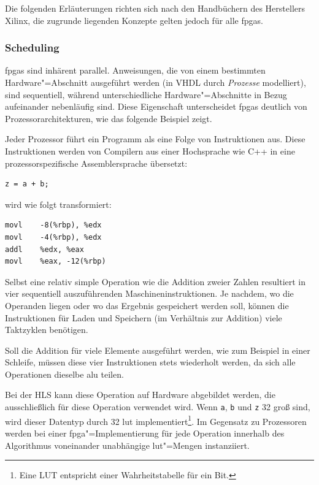 Die folgenden Erläuterungen richten sich nach den Handbüchern des Herstellers
Xilinx, die zugrunde liegenden Konzepte gelten jedoch für alle \gls{fpga}s.

\subsubsection{Scheduling}

\gls{fpga}s sind inhärent parallel. Anweisungen, die von einem bestimmten
Hardware"=Abschnitt ausgeführt werden (in VHDL durch \textit{Prozesse}
modelliert), sind sequentiell, während unterschiedliche Hardware"=Abschnitte in
Bezug aufeinander nebenläufig sind. Diese Eigenschaft unterscheidet \gls{fpga}s
deutlich von Prozessorarchitekturen, wie das folgende Beispiel zeigt.

Jeder Prozessor führt ein Programm als eine Folge von Instruktionen aus. Diese
Instruktionen werden von Compilern aus einer Hochsprache wie C++ in eine
prozessorspezifische Assemblersprache übersetzt:
\begin{code}
    \begin{verbatim}
z = a + b;
    \end{verbatim}
\end{code}
wird wie folgt transformiert:
\begin{code}
    \begin{verbatim}
movl    -8(%rbp), %edx
movl    -4(%rbp), %edx
addl    %edx, %eax
movl    %eax, -12(%rbp)
    \end{verbatim}
\end{code}
Selbst eine relativ simple Operation wie die Addition zweier Zahlen resultiert
in vier sequentiell auszuführenden Maschineninstruktionen. Je nachdem, wo die
Operanden liegen oder wo das Ergebnis gespeichert werden soll, können die
Instruktionen für Laden und Speichern (im Verhältnis zur Addition) viele
Taktzyklen benötigen. \cite[vgl.][18]{hlsintro2019}

Soll die Addition für viele Elemente ausgeführt werden, wie zum Beispiel in
einer Schleife, müssen diese vier Instruktionen stets wiederholt werden, da sich
alle Operationen dieselbe \gls{alu} teilen.

Bei der HLS kann diese Operation auf Hardware abgebildet werden, die
ausschließlich für diese Operation verwendet wird. Wenn \texttt{a}, \texttt{b}
und \texttt{z} \SI{32}{\bit} groß sind, wird dieser Datentyp durch 32 \gls{lut}
implementiert\footnote{Eine LUT entspricht einer Wahrheitstabelle für ein Bit.}.
Im Gegensatz zu Prozessoren werden bei einer \gls{fpga}"=Implementierung für
jede Operation innerhalb des Algorithmus voneinander unabhängige
\gls{lut}"=Mengen instanziiert.
\cite[vgl.][19]{hlsintro2019}

